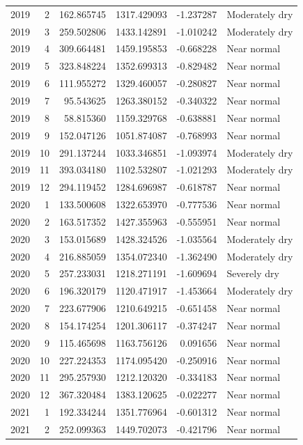 \begin{tabular}{rrrrrl}
2019 & 2 & 162.865745 & 1317.429093 & -1.237287 & Moderately dry \\
2019 & 3 & 259.502806 & 1433.142891 & -1.010242 & Moderately dry \\
2019 & 4 & 309.664481 & 1459.195853 & -0.668228 & Near normal \\
2019 & 5 & 323.848224 & 1352.699313 & -0.829482 & Near normal \\
2019 & 6 & 111.955272 & 1329.460057 & -0.280827 & Near normal \\
2019 & 7 & 95.543625 & 1263.380152 & -0.340322 & Near normal \\
2019 & 8 & 58.815360 & 1159.329768 & -0.638881 & Near normal \\
2019 & 9 & 152.047126 & 1051.874087 & -0.768993 & Near normal \\
2019 & 10 & 291.137244 & 1033.346851 & -1.093974 & Moderately dry \\
2019 & 11 & 393.034180 & 1102.532807 & -1.021293 & Moderately dry \\
2019 & 12 & 294.119452 & 1284.696987 & -0.618787 & Near normal \\
2020 & 1 & 133.500608 & 1322.653970 & -0.777536 & Near normal \\
2020 & 2 & 163.517352 & 1427.355963 & -0.555951 & Near normal \\
2020 & 3 & 153.015689 & 1428.324526 & -1.035564 & Moderately dry \\
2020 & 4 & 216.885059 & 1354.072340 & -1.362490 & Moderately dry \\
2020 & 5 & 257.233031 & 1218.271191 & -1.609694 & Severely dry \\
2020 & 6 & 196.320179 & 1120.471917 & -1.453664 & Moderately dry \\
2020 & 7 & 223.677906 & 1210.649215 & -0.651458 & Near normal \\
2020 & 8 & 154.174254 & 1201.306117 & -0.374247 & Near normal \\
2020 & 9 & 115.465698 & 1163.756126 & 0.091656 & Near normal \\
2020 & 10 & 227.224353 & 1174.095420 & -0.250916 & Near normal \\
2020 & 11 & 295.257930 & 1212.120320 & -0.334183 & Near normal \\
2020 & 12 & 367.320484 & 1383.120625 & -0.022277 & Near normal \\
2021 & 1 & 192.334244 & 1351.776964 & -0.601312 & Near normal \\
2021 & 2 & 252.099363 & 1449.702073 & -0.421796 & Near normal \\

\end{tabular}

